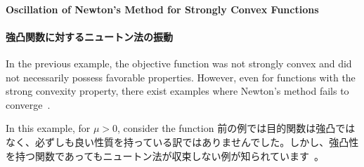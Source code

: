 \documentclass[0_main]{subfiles}
\begin{document}
\ifEn
    \paragraph{Oscillation of Newton's Method for Strongly Convex Functions}
\else
    \paragraph{強凸関数に対するニュートン法の振動}
\fi

\ifEn
    In the previous example, the objective function was not strongly convex and did not necessarily possess favorable properties. However, even for functions with the strong convexity property, there exist examples where Newton's method fails to converge~\citep[Example 1.4.3]{Doikov2021SecondOrderTensor}.

    In this example, for $\mu>0$, consider the function
\else
    前の例では目的関数は強凸ではなく、必ずしも良い性質を持っている訳ではありませんでした。しかし、強凸性を持つ関数であってもニュートン法が収束しない例が知られています~\citep[Example 1.4.3]{Doikov2021SecondOrderTensor}。
\end{document}
